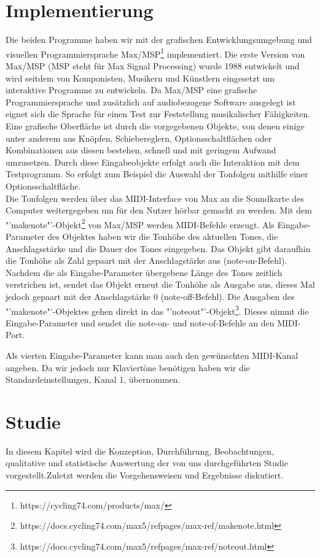 \documentclass{acm_proc_article-sp}
\begin{document}
\section{Implementierung}
Die beiden Programme haben wir mit der grafischen Entwicklungsumgebung und visuellen Programmiersprache Max/MSP\footnote{https://cycling74.com/products/max/} implementiert. Die erste Version von Max/MSP (MSP steht für Max Signal Processing) \cite{wiki:max} wurde 1988 entwickelt und wird seitdem von Komponisten, Musikern und Künstlern eingesetzt um interaktive Programme zu entwickeln. Da Max/MSP eine grafische Programmiersprache und zusätzlich auf audiobezogene Software ausgelegt ist eignet sich die Sprache für einen Test zur Feststellung musikalischer Fähigkeiten.\\
Eine grafische Oberfläche ist durch die vorgegebenen Objekte, von denen einige unter anderem aus Knöpfen, Schiebereglern, Optionsschaltflächen oder Kombinationen aus diesen bestehen, schnell und mit geringem Aufwand umzusetzen. Durch diese Eingabeobjekte erfolgt auch die Interaktion mit dem Testprogramm. So erfolgt zum Beispiel die Auswahl der Tonfolgen mithilfe einer Optionsschaltfläche.\\
Die Tonfolgen werden über das MIDI-Interface von Max an die Soundkarte des Computer weitergegeben um für den Nutzer hörbar gemacht zu werden. Mit dem "'makenote"'-Objekt\footnote{https://docs.cycling74.com/max5/refpages/max-ref/makenote.html} von Max/MSP werden MIDI-Befehle erzeugt. Als Eingabe-Parameter des Objektes haben wir die Tonhöhe des aktuellen Tones, die Anschlagsstärke und die Dauer des Tones  eingegeben. Das Objekt gibt daraufhin die Tonhöhe als Zahl gepaart mit der Anschlagstärke aus (note-on-Befehl). Nachdem die als Eingabe-Parameter übergebene Länge des Tones zeitlich verstrichen ist, sendet das Objekt erneut die Tonhöhe als Ausgabe aus, dieses Mal jedoch gepaart mit der Anschlagstärke 0 (note-off-Befehl). Die Ausgaben des "'makenote"'-Objektes gehen direkt in das "'noteout"'-Objekt\footnote{https://docs.cycling74.com/max5/refpages/max-ref/noteout.html}. Dieses nimmt die Eingabe-Parameter und sendet die note-on- und note-of-Befehle an den MIDI-Port.


Als vierten Eingabe-Parameter kann man auch den gewünschten MIDI-Kanal angeben. Da wir jedoch nur Klaviertöne benötigen haben wir die Standardeinstellungen, Kanal 1, übernommen.

\section{Studie}
In diesem Kapitel wird die Konzeption, Durchführung, Beobachtungen, qualitative und statistische Auswertung der von uns durchgeführten Studie vorgestellt.Zuletzt werden die Vorgehensweisen und Ergebnisse diskutiert.
\end{document}
